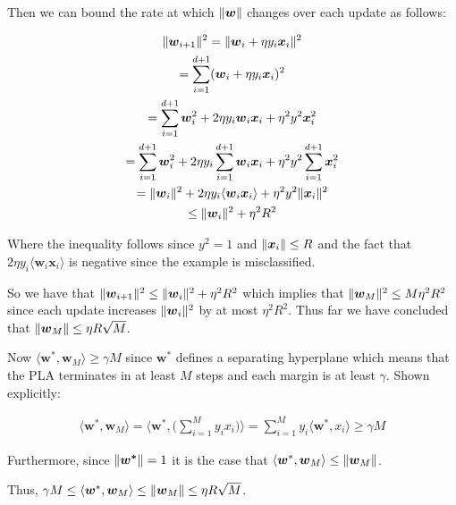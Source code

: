 \documentclass[11pt, oneside]{article}   	%
\begin{document}
Then we can bound the rate at which $\lVert\boldsymbol{w}\rVert$ changes over each update as follows:

\begin{gather*}
\lVert\boldsymbol{w}_{i + 1}\rVert^2 = \lVert\boldsymbol{w}_{i} + \eta y_i \boldsymbol{x}_i\rVert^2\\
= \sum_{i = 1}^{d + 1}(\boldsymbol{w}_i + \eta y_i \boldsymbol{x}_i)^2\\
= \sum_{i = 1}^{d + 1}\boldsymbol{w}_i^2 + 2\eta y_i \boldsymbol{w}_i \boldsymbol{x}_i + \eta^2 y^2 \boldsymbol{x}_i^2\\
= \sum_{i = 1}^{d + 1}\boldsymbol{w}_i^2 + 2\eta y_i  \sum_{i = 1}^{d + 1} \boldsymbol{w}_i \boldsymbol{x}_i + \eta^2 y^2 \sum_{i = 1}^{d + 1}\boldsymbol{x}_i^2\\
= \lVert\boldsymbol{w}_i\rVert^2 + 2\eta y_i  \langle \boldsymbol{w}_i \boldsymbol{x}_i \rangle + \eta^2 y^2 \lVert\boldsymbol{x}_i\rVert^2\\
\leq \lVert\boldsymbol{w}_i\rVert^2 + \eta^2 R^2
\end{gather*}

Where the inequality follows since $y^2 = 1$ and $\lVert\boldsymbol{x}_i\rVert \leq R$ and the fact that $2\eta y_i  \langle \boldsymbol{w}_i \boldsymbol{x}_i \rangle$ is negative since the example is misclassified.

So we have that $\lVert\boldsymbol{w}_{i + 1}\rVert^2 \leq \lVert\boldsymbol{w}_i\rVert^2 + \eta^2 R^2$ which implies that $\lVert\boldsymbol{w}_{M}\rVert^2 \leq M\eta^2 R^2$ since each update increases $\lVert\boldsymbol{w}_{i}\rVert^2$ by at most $\eta^2 R^2$.  Thus far we have concluded that $\lVert\boldsymbol{w}_{M}\rVert \leq \eta R \sqrt{M}$.  

Now $\langle \boldsymbol{w}^*, \boldsymbol{w}_{M}\rangle \geq \gamma M$ since $\boldsymbol{w}^*$ defines a separating hyperplane which means that the PLA terminates in at least $M$ steps and each margin is at least $\gamma$.  Shown explicitly:

\begin{gather*}
\langle \boldsymbol{w}^*, \boldsymbol{w}_{M}\rangle = \langle \boldsymbol{w}^*, \bigg( \sum_{i = 1}^{M}y_ix_i \bigg) \rangle =  \sum_{i = 1}^{M}  y_i\langle \boldsymbol{w}^*,x_i \rangle \geq \gamma M
\end{gather*}

Furthermore, since $\lVert\boldsymbol{w^*}\rVert = 1$ it is the case that $\langle \boldsymbol{w}^*, \boldsymbol{w}_{M}\rangle \leq \lVert\boldsymbol{w}_{M}\rVert$.

Thus, $\gamma M \leq \langle \boldsymbol{w}^*, \boldsymbol{w}_{M}\rangle \leq \lVert\boldsymbol{w}_{M}\rVert \leq \eta R \sqrt{M}$.
\end{document}
